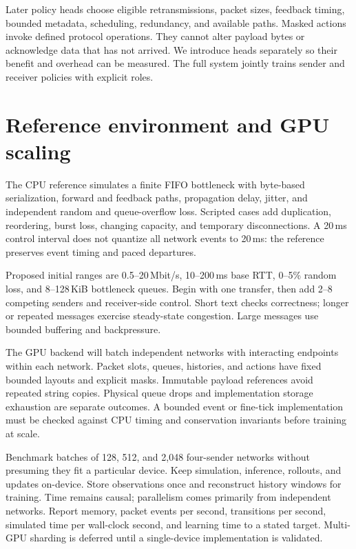 \documentclass[11pt]{article}
\begin{document}
Later policy heads choose eligible retransmissions, packet sizes, feedback
timing, bounded metadata, scheduling, redundancy, and available paths. Masked
actions invoke defined protocol operations. They cannot alter payload bytes or
acknowledge data that has not arrived. We introduce heads separately so their
benefit and overhead can be measured. The full system jointly trains sender and
receiver policies with explicit roles.

\section{Reference environment and GPU scaling}
The CPU reference simulates a finite FIFO bottleneck with byte-based
serialization, forward and feedback paths, propagation delay, jitter, and
independent random and queue-overflow loss. Scripted cases add duplication,
reordering, burst loss, changing capacity, and temporary disconnections. A
20\,ms control interval does not quantize all network events to 20\,ms: the
reference preserves event timing and paced departures.

Proposed initial ranges are 0.5--20\,Mbit/s, 10--200\,ms base RTT,
0--5\% random loss, and 8--128\,KiB bottleneck queues. Begin with one transfer,
then add 2--8 competing senders and receiver-side control. Short text checks
correctness; longer or repeated messages exercise steady-state congestion.
Large messages use bounded buffering and backpressure.

The GPU backend will batch independent networks with interacting endpoints
within each network. Packet slots, queues, histories, and actions have fixed
bounded layouts and explicit masks. Immutable payload references avoid repeated
string copies. Physical queue drops and implementation storage exhaustion are
separate outcomes. A bounded event or fine-tick implementation must be checked
against CPU timing and conservation invariants before training at scale.

Benchmark batches of 128, 512, and 2,048 four-sender networks without presuming
they fit a particular device. Keep simulation, inference, rollouts, and updates
on-device. Store observations once and reconstruct history windows for training.
Time remains causal; parallelism comes primarily from independent networks.
Report memory, packet events per second, transitions per second, simulated time
per wall-clock second, and learning time to a stated target. Multi-GPU sharding
is deferred until a single-device implementation is validated.
\end{document}
